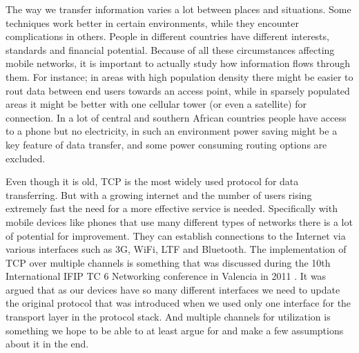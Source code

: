 \documentclass[11pt,twocolumn]{article}
\begin{document}
The way we transfer information varies a lot between places and situations. Some techniques work better in certain environments, while they encounter complications in others. People in different countries have different interests, standards and financial potential. Because of all these circumstances affecting mobile networks, it is important to actually study how information flows through them. For instance; in areas with high population density there might be easier to rout data between end users towards an access point, while in sparsely populated areas it might be better with one cellular tower (or even a satellite) for connection. In a lot of central and southern African countries people have access to a phone but no electricity, in such an environment power saving might be a key feature of data transfer, and some power consuming routing options are excluded.

Even though it is old, TCP is the most widely used protocol for data transferring. But with a growing internet and the number of users rising extremely fast the need for a more effective service is needed. Specifically with mobile devices like phones that use many different types of networks there is a lot of potential for improvement. They can establish connections to the Internet via various interfaces such as 3G, WiFi, LTF and Bluetooth. The implementation of TCP over multiple channels is something that was discussed during the 10th International IFIP TC 6 Networking conference in Valencia in 2011 \cite{RFC6824}. It was argued that as our devices have so many different interfaces we need to update the original protocol that was introduced when we used only one interface for the transport layer in the protocol stack. And multiple channels for utilization is something we hope to be able to at least argue for and make a few assumptions about it in the end.


\end{document}
